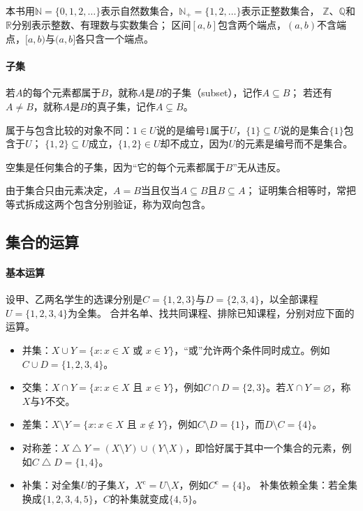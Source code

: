 本书用$\mathbb N=\{0,1,2,\ldots\}$表示自然数集合，$\mathbb N_+=\{1,2,\ldots\}$表示正整数集合，
$\mathbb Z$、$\mathbb Q$和$\mathbb R$分别表示整数、有理数与实数集合；
区间$[a,b]$包含两个端点，$(a,b)$不含端点，$[a,b)$与$(a,b]$各只含一个端点。

\paragraph{子集}
若$A$的每个元素都属于$B$，就称$A$是$B$的子集（subset），记作$A\subseteq B$；
若还有$A\neq B$，就称$A$是$B$的真子集，记作$A\subsetneq B$。

属于与包含比较的对象不同：$1\in U$说的是编号$1$属于$U$，$\{1\}\subseteq U$说的是集合$\{1\}$包含于$U$；
$\{1,2\}\subseteq U$成立，$\{1,2\}\in U$却不成立，因为$U$的元素是编号而不是集合。

空集是任何集合的子集，因为“它的每个元素都属于$B$”无从违反。

由于集合只由元素决定，$A=B$当且仅当$A\subseteq B$且$B\subseteq A$；
证明集合相等时，常把等式拆成这两个包含分别验证，称为双向包含。

\subsection{集合的运算}
\label{sec:prelim-set-operations}

\paragraph{基本运算}
设甲、乙两名学生的选课分别是$C=\{1,2,3\}$与$D=\{2,3,4\}$，以全部课程$U=\{1,2,3,4\}$为全集。
合并名单、找共同课程、排除已知课程，分别对应下面的运算。
\begin{itemize}
 \item 并集：$X\cup Y=\{x:x\in X\text{ 或 }x\in Y\}$，“或”允许两个条件同时成立。例如$C\cup D=\{1,2,3,4\}$。
 \item 交集：$X\cap Y=\{x:x\in X\text{ 且 }x\in Y\}$，例如$C\cap D=\{2,3\}$。若$X\cap Y=\varnothing$，称$X$与$Y$不交。
 \item 差集：$X\setminus Y=\{x:x\in X\text{ 且 }x\notin Y\}$，例如$C\setminus D=\{1\}$，而$D\setminus C=\{4\}$。
 \item 对称差：$X\mathbin{\triangle}Y=(X\setminus Y)\cup(Y\setminus X)$，即恰好属于其中一个集合的元素，例如$C\mathbin{\triangle}D=\{1,4\}$。
 \item 补集：对全集$U$的子集$X$，$X^{\mathrm c}=U\setminus X$，例如$C^{\mathrm c}=\{4\}$。
       补集依赖全集：若全集换成$\{1,2,3,4,5\}$，$C$的补集就变成$\{4,5\}$。
\end{itemize}

